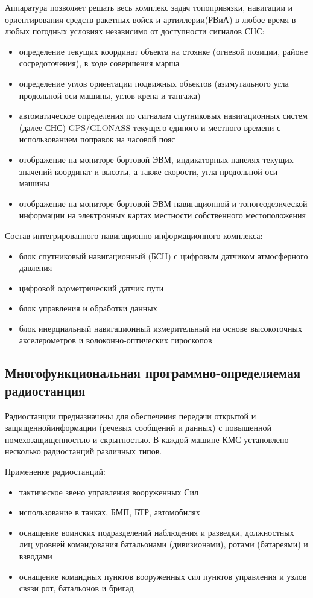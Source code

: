 Аппаратура позволяет  решать весь комплекс задач топопривязки, навигации и ориентирования средств ракетных войск и артиллерии(РВиА) в любое время в любых погодных условиях независимо от доступности сигналов СНС:
\begin{itemize}
	\item определение текущих координат объекта на стоянке (огневой позиции, районе сосредоточения), в ходе совершения марша
	\item определение углов ориентации подвижных объектов (азимутального угла продольной оси машины, углов крена и тангажа)
	\item автоматическое определения по сигналам спутниковых навигационных систем (далее СНС) GPS/GLONASS текущего единого и местного времени с использованием поправок на часовой пояс
	\item отображение на мониторе бортовой ЭВМ, индикаторных панелях текущих значений координат и высоты, а также скорости, угла продольной оси машины
	\item отображение на мониторе бортовой ЭВМ навигационной и топогеодезической информации на электронных картах местности собственного местоположения
\end{itemize}

Состав интегрированного навигационно-информационного комплекса:
\begin{itemize}
	\item блок спутниковый навигационный (БСН) с цифровым датчиком атмосферного давления
	\item цифровой одометрический датчик пути
	\item блок управления и обработки данных
	\item блок инерциальный навигационный измерительный на основе высокоточных акселерометров и волоконно-оптических гироскопов
\end{itemize}

\subsection{Многофункциональная программно-определяемая радиостанция}
\label{sub:lit_review:radio}

Радиостанции предназначены для обеспечения передачи открытой и защищеннойинформации (речевых сообщений и данных) с
повышенной помехозащищенностью и скрытностью.
В каждой машине КМС установлено несколько радиостанций различных типов.

Применение радиостанций:
\begin{itemize}
	\item тактическое звено управления вооруженных Сил
	\item использование в танках, БМП, БТР, автомобилях
	\item оснащение воинских подразделений наблюдения и разведки, должностных лиц уровней командования батальонами (дивизионами), ротами (батареями) и взводами
	\item оснащение командных пунктов вооруженных сил пунктов управления и узлов связи рот, батальонов и бригад
\end{itemize}

